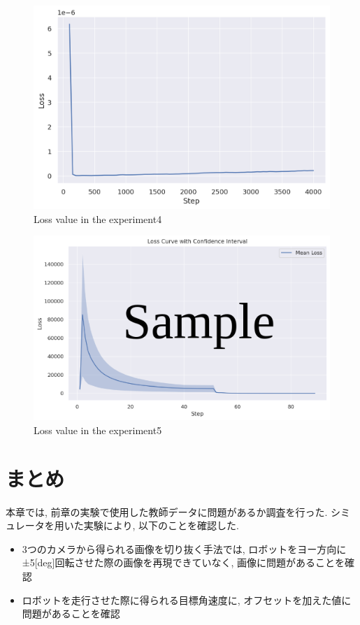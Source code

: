 \begin{figure}[h]
  \centering
  \includegraphics[keepaspectratio, scale=0.55]{images/00_02_rename_9.png}
  \caption{Loss value in the experiment4}
  \label{Fig:sample4}
\end{figure}

\begin{figure}[h]
  \centering
  \includegraphics[keepaspectratio, scale=0.55]{images/sample.png}
  \caption{Loss value in the experiment5}
  \label{Fig:sample5}
\end{figure}

\newpage
\section{まとめ}
本章では, 前章の実験で使用した教師データに問題があるか調査を行った. シミュレータを用いた実験により, 以下のことを確認した.

\begin{itemize}
  \item 3つのカメラから得られる画像を切り抜く手法では, ロボットをヨー方向に±5[deg]回転させた際の画像を再現できていなく, 画像に問題があることを確認
  \item ロボットを走行させた際に得られる目標角速度に, オフセットを加えた値に問題があることを確認
\end{itemize}

